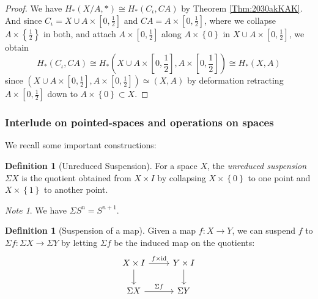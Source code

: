 \documentclass[reqno]{amsart}
\theoremstyle{definition}
\newtheorem{definition}[theorem]{Definition}
\theoremstyle{remark}
\newtheorem*{note}{Note}
\newcommand{\id}{{\mathrm{id}}}
\begin{document}
\begin{proof}
    We have
    $H_* \left( X/A , *\right) \cong
    H_* \left( C_{\iota}, CA \right) $ by Theorem
    \ref{Thm:2030akKAK}. And since
    $C_{\iota} = X \cup A \times \left[ 0,\frac{1}{2} \right] $ 
    and $CA = A \times \left[ 0,\frac{1}{2} \right] $, where
    we collapse $A \times \left\{ \frac{1}{2} \right\} $ in
    both, and attach  $A \times \left[ 0,\frac{1}{2} \right] $ 
    along $A \times \left\{ 0 \right\} $ in
    $X \cup A \times \left[ 0,\frac{1}{2} \right] $, we obtain
    \[
    H_*(C_{\iota}, CA) \cong
    H_* \left( X \cup A \times \left[ 0,\frac{1}{2} \right] ,
    A \times \left[ 0, \frac{1}{2} \right] \right) 
    \cong H_* (X, A)
    \] 
    since 
    $\left( X \cup A \times \left[ 0,\frac{1}{2} \right] ,
    A \times \left[ 0,\frac{1}{2} \right] \right) 
    \simeq \left( X,A \right) $ by deformation retracting
    $A \times \left[ 0,\frac{1}{2} \right] $ down to
    $A \times \left\{ 0 \right\} \subset X$.
\end{proof}


\subsubsection{Interlude on pointed-spaces and
operations on spaces}

We recall some important constructions:

\begin{definition}[Unreduced Suspension]
    For a space $X$, the \textit{unreduced suspension} 
    $\Sigma X$ is the
    quotient obtained from $X \times I$ by
    collapsing $X \times \left\{ 0 \right\} $ to one
    point and $X \times \left\{ 1 \right\} $ to another
    point.
\end{definition}

\begin{note}
    We have $\Sigma S^{n} = S^{n+1}$.
\end{note}



\begin{definition}[Suspension of a map]
    Given a map
    $f \colon X \to Y$, we can suspend $f$ to
    $\Sigma f \colon \Sigma X \to \Sigma Y$
    by letting $\Sigma f$ be the induced
    map on the quotients:
    \begin{equation*}
    \begin{tikzcd}
        X \times I \ar[r, "f \times \id"] \ar[d]  & Y \times I \ar[d] \\
        \Sigma X \ar[r, "\Sigma f"] & \Sigma Y
    \end{tikzcd}
    \end{equation*}
    
\end{definition}
\end{document}
